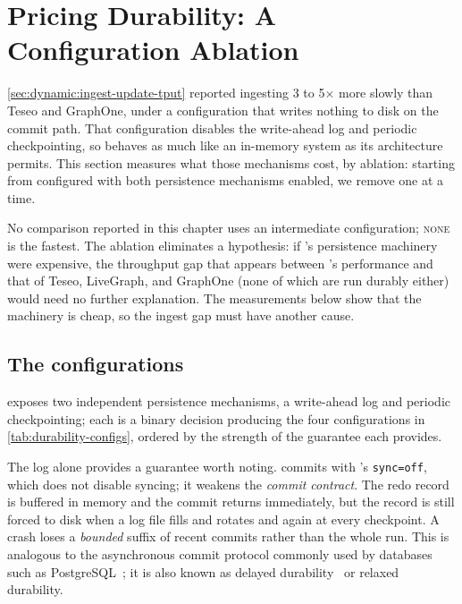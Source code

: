 \section{Pricing Durability: A Configuration Ablation}
\label{sec:eval:dynamic:durability}

\autoref{sec:dynamic:ingest-update-tput} reported \project{} ingesting 3 to 5$\times$ more slowly than Teseo and GraphOne, under a configuration that writes nothing to disk on the commit path.
That configuration disables the write-ahead log and periodic checkpointing, so \project{} behaves as much like an in-memory system as its architecture permits.
This section measures what those mechanisms cost, by ablation: starting from \project{} configured with both persistence mechanisms enabled, we remove one at a time.

No comparison reported in this chapter uses an intermediate configuration; \textsc{none} is the fastest.
The ablation eliminates a hypothesis: if \project{}'s persistence machinery were expensive, the throughput gap that appears between \project{}'s performance and that of Teseo, LiveGraph, and GraphOne (none of which are run durably either) would need no further explanation.
The measurements below show that the machinery is cheap, so the ingest gap must have another cause.

\subsection{The configurations}
\label{sec:eval:dynamic:durability:configs}

\wt{} exposes two independent persistence mechanisms, a write-ahead log and
periodic checkpointing; each is a binary decision producing the four configurations in \autoref{tab:durability-configs}, ordered by the strength of the guarantee each provides.

The log alone provides a guarantee worth noting.
\project{} commits with \wt{}'s \texttt{sync=off}, which does not disable syncing; it weakens the \emph{commit contract}.
The redo record is buffered in memory and the commit returns immediately, but the record is still forced to disk when a log file fills and rotates and again at every checkpoint.
A crash loses a \emph{bounded} suffix of recent commits rather than the whole run.
This is analogous to the asynchronous commit protocol commonly used by databases such as PostgreSQL~\cite{asyncCommit}; it is also known as delayed durability~\cite{mssqlDelayedDurability} or relaxed durability.

